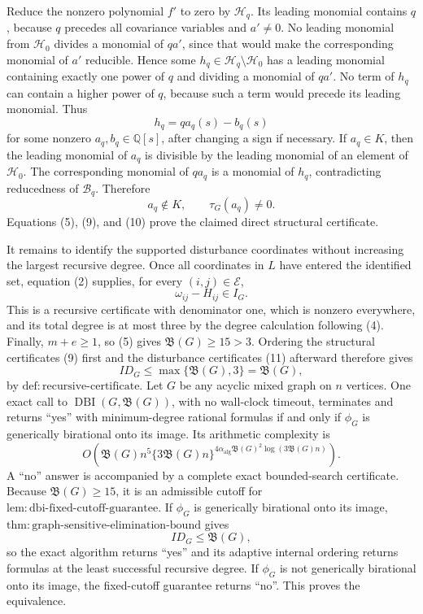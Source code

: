 Reduce the nonzero polynomial \(f'\) to zero by \(\mathcal H_q\).  Its leading monomial contains \(q\), because \(q\) precedes all covariance variables and \(a'\neq0\).  No leading monomial from \(\mathcal H_0\) divides a monomial of \(qa'\), since that would make the corresponding monomial of \(a'\) reducible.  Hence some \(h_q\in\mathcal H_q\setminus\mathcal H_0\) has a leading monomial containing exactly one power of \(q\) and dividing a monomial of \(qa'\).  No term of \(h_q\) can contain a higher power of \(q\), because such a term would precede its leading monomial.  Thus
\[
 h_q=q a_q(s)-b_q(s)
 \tag{9}
\]
for some nonzero \(a_q,b_q\in\mathbb Q[s]\), after changing a sign if necessary.  If \(a_q\in K\), then the leading monomial of \(a_q\) is divisible by the leading monomial of an element of \(\mathcal H_0\).  The corresponding monomial of \(q a_q\) is a monomial of \(h_q\), contradicting reducedness of \(\mathcal B_q\).  Therefore
\[
 a_q\notin K,
 \qquad
 \tau_G(a_q)\neq0.
 \tag{10}
\]
Equations (5), (9), and (10) prove the claimed direct structural certificate.

It remains to identify the supported disturbance coordinates without increasing the largest recursive degree.  Once all coordinates in \(L\) have entered the identified set, equation (2) supplies, for every \((i,j)\in\mathcal E\),
\[
 \omega_{ij}-H_{ij}\in I_G.
 \tag{11}
\]
This is a recursive certificate with denominator one, which is nonzero everywhere, and its total degree is at most three by the degree calculation following (4).  Finally, \(m+e\geq1\), so (5) gives \(\mathfrak B(G)\geq15>3\).  Ordering the structural certificates (9) first and the disturbance certificates (11) afterward therefore gives
\[
 ID_G\leq\max\{\mathfrak B(G),3\}=\mathfrak B(G),
\]
by \(\mathrm{def:recursive\mbox{-}certificate}\).
Let \(G\) be any acyclic mixed graph on \(n\) vertices.  One exact call to \(\operatorname{DBI}(G,\mathfrak B(G))\), with no wall-clock timeout, terminates and returns ``yes'' with minimum-degree rational formulas if and only if \(\phi_G\) is generically birational onto its image.  Its arithmetic complexity is
\[
 O\!\left(
 \mathfrak B(G)n^5
 \{3\mathfrak B(G)n\}^{4\alpha_{\mathrm{alg}}\mathfrak B(G)^2\log(3\mathfrak B(G)n)}
 \right).
\]
A ``no'' answer is accompanied by a complete exact bounded-search certificate.
Because \(\mathfrak B(G)\geq15\), it is an admissible cutoff for \(\mathrm{lem:dbi\mbox{-}fixed\mbox{-}cutoff\mbox{-}guarantee}\).  If \(\phi_G\) is generically birational onto its image, \(\mathrm{thm:graph\mbox{-}sensitive\mbox{-}elimination\mbox{-}bound}\) gives
\[
 ID_G\leq\mathfrak B(G),
 \tag{1}
\]
so the exact algorithm returns ``yes'' and its adaptive internal ordering returns formulas at the least successful recursive degree.  If \(\phi_G\) is not generically birational onto its image, the fixed-cutoff guarantee returns ``no''.  This proves the equivalence.

